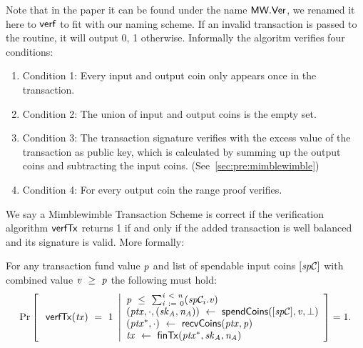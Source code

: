 \begin{definition}
\begin{itemize}
        Note that in the paper it can be found under the name $\mathsf{MW.Ver}$, we renamed it here to $\mathsf{verf}$ to fit with our naming scheme.
        If an invalid transaction is passed to the routine, it will output 0, 1 otherwise.
        Informally the algoritm verifies four conditions:
        \begin{enumerate}
            \item Condition 1: Every input and output coin only appears once in the transaction.
            \item Condition 2: The union of input and output coins is the empty set.
            \item Condition 3: The transaction signature verifies with the excess value of the transaction as public key, which is calculated by summing up the output coins and subtracting the input coins. (See~\cref{sec:pre:mimblewimble})
            \item Condition 4: For every output coin the range proof verifies.
        \end{enumerate}
    \end{itemize}
\end{definition}

We say a Mimblewimble Transaction Scheme is correct if the verification algorithm $\mathsf{verfTx}$ returns 1 if and only if the added transaction is well balanced and its signature is valid.
More formally:
\begin{definition}
    \label{def:atom:tx-scheme-correctness}
    For any transaction fund value $\mathit{p}$ and list of spendable input coins $[\mathit{sp}\mathcal{C}]$ with combined value $\mathit{v} ~\geq~ \mathit{p}$ the following must hold:
    \[
        \Pr\left[
        \begin{array}{c}
            \: \mathsf{verfTx}(\mathit{tx}) ~=~ 1
        \end{array}
        \middle\vert
        \begin{array}{l}
            \mathit{p} ~\leq~ \sum_{\mathit{i} ~:=~ 0}^{\mathit{i} ~<~ \mathit{n}}(\mathit{sp}\mathcal{C}_{i}.\mathit{v}) \\
            (\mathit{ptx}, \cdot, (\mathit{sk}_{\mathit{A}}, \mathit{\mathit{n}_{\mathit{A}}})) ~\leftarrow~ \mathsf{spendCoins}([\mathit{sp}\mathcal{C}],\mathit{v},\bot) \\
            (\mathit{ptx}^*, \cdot) ~\leftarrow~ \mathsf{recvCoins}(\mathit{ptx},\mathit{p}) \\
            \mathit{tx} ~\leftarrow~ \mathsf{finTx}(\mathit{ptx}^*,\mathit{sk}_{\mathit{A}},\mathit{\mathit{n}_{\mathit{A}}})
        \end{array}
        \right]=1.
    \]
\end{definition}

